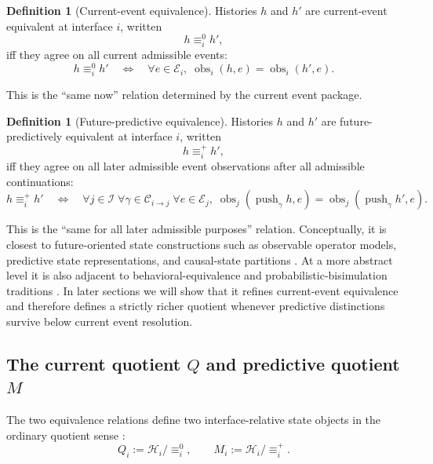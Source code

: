 \documentclass[11pt]{article}
\newcommand{\CurrentQ}{Q}
\newcommand{\PredictiveQ}{M}
\newcommand{\Histories}{\mathcal{H}}
\newcommand{\Interfaces}{\mathcal{I}}
\newcommand{\CurrentEquiv}{\equiv^{0}}
\newcommand{\FutureEquiv}{\equiv^{+}}
\theoremstyle{definition}
\newtheorem{definition}[theorem]{Definition}
\begin{document}
\begin{definition}[Current-event equivalence]\label{def:current-event-equivalence}
Histories $h$ and $h'$ are current-event equivalent at interface $i$, written
\[
h \CurrentEquiv_i h',
\]
iff they agree on all current admissible events:
\begin{equation}
h \CurrentEquiv_i h'
\quad\Longleftrightarrow\quad
\forall e\in\mathcal{E}_i,\;
\operatorname{obs}_i(h,e)=\operatorname{obs}_i(h',e).
\label{eq:current-equivalence}
\end{equation}
\end{definition}

This is the ``same now'' relation determined by the current event package.

\begin{definition}[Future-predictive equivalence]\label{def:future-predictive-equivalence}
Histories $h$ and $h'$ are future-predictively equivalent at interface $i$, written
\[
h \FutureEquiv_i h',
\]
iff they agree on all later admissible event observations after all admissible continuations:
\begin{equation}
h \FutureEquiv_i h'
\quad\Longleftrightarrow\quad
\forall j\in\Interfaces\;\forall \gamma\in\mathcal{C}_{i\to j}\;\forall e\in\mathcal{E}_j,\;
\operatorname{obs}_j(\operatorname{push}_{\gamma} h,e)
=
\operatorname{obs}_j(\operatorname{push}_{\gamma} h',e).
\label{eq:future-equivalence}
\end{equation}
\end{definition}

This is the ``same for all later admissible purposes'' relation. Conceptually, it is closest to future-oriented state constructions such as observable operator models, predictive state representations, and causal-state partitions \citep{Jaeger2000ObservableOperatorModels,LittmanSuttonSingh2002PredictiveRepresentationsState,ShaliziCrutchfield2001ComputationalMechanics}. At a more abstract level it is also adjacent to behavioral-equivalence and probabilistic-bisimulation traditions \citep{Milner1989CommunicationConcurrency,LarsenSkou1991BisimulationThroughProbabilisticTesting}. In later sections we will show that it refines current-event equivalence and therefore defines a strictly richer quotient whenever predictive distinctions survive below current event resolution.

\subsection{The current quotient \texorpdfstring{$\CurrentQ$}{Q} and predictive quotient \texorpdfstring{$\PredictiveQ$}{M}}\label{subsec:rtp-quotients}
The two equivalence relations define two interface-relative state objects in the ordinary quotient sense \citep{MacLaneBirkhoff1999Algebra,BurrisSankappanavar1981CourseUniversalAlgebra}:
\begin{equation}
\CurrentQ_i := \Histories_i / \CurrentEquiv_i,
\qquad
\PredictiveQ_i := \Histories_i / \FutureEquiv_i.
\label{eq:quotients}
\end{equation}
\end{document}
